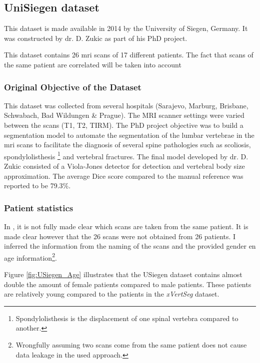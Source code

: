 
\subsection{UniSiegen dataset}

This dataset is made available in 2014 by the University of Siegen, Germany.
It was constructed by dr. D. Zukic \cite{Zukic2014} as part of his PhD project.


This dataset contains 26 \acrshort{mri} scans of 17 different patients. 
The fact that scans of the same patient are correlated will be taken into account 

\subsubsection{Original Objective of the Dataset}

This dataset was collected from several hospitals (Sarajevo, Marburg, Brisbane, Schwabach, Bad Wildungen \& Prague). The MRI scanner settings were varied between the scans (T1, T2, TIRM).
The PhD project objective was to build a segmentation model to automate the segmentation of the lumbar vertebrae in the \acrshort{mri} scans to facilitate the diagnosis of several spine pathologies 
such as scoliosis, spondylolisthesis \footnote{Spondylolisthesis is the displacement of one spinal vertebra compared to another.} and vertebral fractures.
The final model developed by dr. D. Zukic consisted of a Viola-Jones detector for detection and vertebral body size approximation.
The average Dice score compared to the manual reference was reported to be 79.3\%.

\subsubsection{Patient statistics}

In \cite{Zukic2014}, it is not fully made clear which scans are taken from the same patient.
It is made clear however that the 26 scans were not obtained from 26 patients.
I inferred the information from the naming of the scans and the provided gender en age information\footnote{
    Wrongfully assuming two scans come from the same patient does not cause data leakage in the used approach.
}.

Figure \ref{fig:USiegen_Age} illustrates that the USiegen dataset contains almost double the amount of female patients compared to male patients.
These patients are relatively young compared to the patients in the \textit{xVertSeg} dataset.

